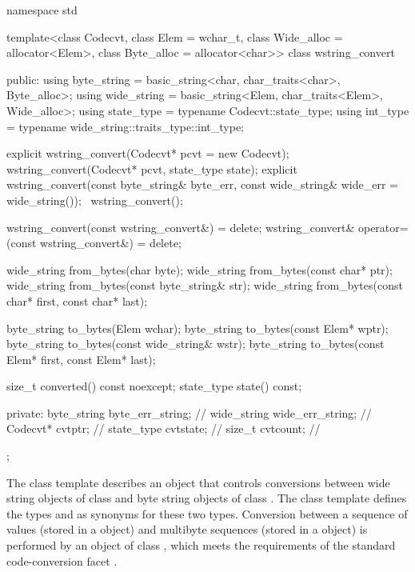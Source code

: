 %
\begin{codeblock}
namespace std {
  template<class Codecvt, class Elem = wchar_t,
           class Wide_alloc = allocator<Elem>,
           class Byte_alloc = allocator<char>>
    class wstring_convert {
    public:
      using byte_string = basic_string<char, char_traits<char>, Byte_alloc>;
      using wide_string = basic_string<Elem, char_traits<Elem>, Wide_alloc>;
      using state_type  = typename Codecvt::state_type;
      using int_type    = typename wide_string::traits_type::int_type;

      explicit wstring_convert(Codecvt* pcvt = new Codecvt);
      wstring_convert(Codecvt* pcvt, state_type state);
      explicit wstring_convert(const byte_string& byte_err,
                               const wide_string& wide_err = wide_string());
      ~wstring_convert();

      wstring_convert(const wstring_convert&) = delete;
      wstring_convert& operator=(const wstring_convert&) = delete;

      wide_string from_bytes(char byte);
      wide_string from_bytes(const char* ptr);
      wide_string from_bytes(const byte_string& str);
      wide_string from_bytes(const char* first, const char* last);

      byte_string to_bytes(Elem wchar);
      byte_string to_bytes(const Elem* wptr);
      byte_string to_bytes(const wide_string& wstr);
      byte_string to_bytes(const Elem* first, const Elem* last);

      size_t converted() const noexcept;
      state_type state() const;

    private:
      byte_string byte_err_string;  // \expos
      wide_string wide_err_string;  // \expos
      Codecvt* cvtptr;              // \expos
      state_type cvtstate;          // \expos
      size_t cvtcount;              // \expos
    };
}
\end{codeblock}

\pnum
The class template describes an object that controls conversions between wide
string objects of class  and byte string objects of class . The class template defines the types
 and  as synonyms for these two types.
Conversion between a sequence of  values (stored in a
 object) and multibyte sequences (stored in a
 object) is performed by an object of class
, which meets the
requirements of the standard code-conversion facet .

